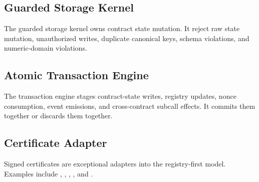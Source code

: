 \subsection{Guarded Storage Kernel}

The guarded storage kernel owns contract state mutation. It \MUST{} reject raw state mutation, unauthorized writes, duplicate canonical keys, schema violations, and numeric-domain violations.

\subsection{Atomic Transaction Engine}

The transaction engine stages contract-state writes, registry updates, nonce consumption, event emissions, and cross-contract subcall effects. It commits them together or discards them together.

\subsection{Certificate Adapter}

Signed certificates are exceptional adapters into the registry-first model. Examples include , , , , and .
